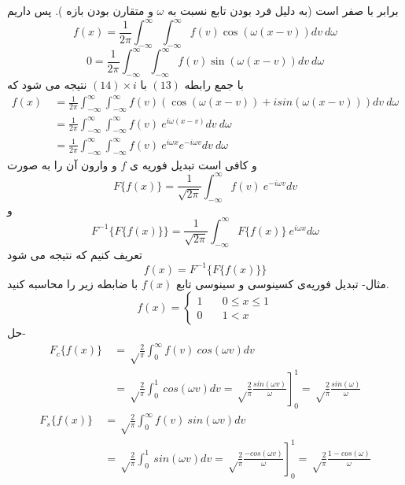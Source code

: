 برابر با صفر است (به دلیل فرد بودن تابع نسبت به
$\omega$
و متقارن بودن بازه
).
پس داریم
\begin{equation}
	f(x)= \frac{1}{2\pi}\int_{-{\infty}}^{{\infty}}\int_{-{\infty}}^{{\infty}} f(v)\cos(  \omega(x-v) ) d v \ d\omega
\end{equation}
\begin{equation}
	0= \frac{1}{2\pi}\int_{-{\infty}}^{{\infty}}\int_{-{\infty}}^{{\infty}} f(v)\sin(  \omega(x-v) ) d v \ d\omega
\end{equation}
با جمع رابطه
$(13)$
با
$(14)\times i$
نتیجه می شود که
\begin{equation*}
	\begin{aligned}
		f(x) {} &\
		= \frac{1}{2\pi}\int_{-{\infty}}^{{\infty}}\int_{-{\infty}}^{{\infty}} f(v)(\cos(\omega(x-v)) +isin(  \omega(x-v)) ) d v \ d\omega
		\\ &\
		=\frac{1}{2\pi}\int_{-{\infty}}^{{\infty}}\int_{-{\infty}}^{{\infty}} f(v) \ e^{i\omega(x-v)} d v \ d\omega
		\\ &\
		=\frac{1}{2\pi}\int_{-{\infty}}^{{\infty}}\int_{-{\infty}}^{{\infty}} f(v) \ e^{i\omega x} e^{-i\omega v} d v \ d\omega
	\end{aligned}
\end{equation*}
و کافی است تبدیل فوریه ی
$f$
و وارون آن را به صورت
\[
F\{f(x)\}=\frac{1} {\sqrt{2\pi}}\int_{-{\infty}}^{{\infty}} f(v) \ e^{-i\omega v} d v
\]
و
\[
F^{-1}\{F\{f(x)\}\}=\frac{1} {\sqrt{2\pi}}\int_{-{\infty}}^{{\infty}}F\{f(x)\} \ e^{i\omega x} d \omega
\]
تعریف کنیم که نتیجه می شود
\[
f(x)=F^{-1}\{F\{f(x)\}\}
\]
مثال- تبدیل فوریه‌‌ی کسینوسی و سینوسی تابع 
$f(x)$
با ضابطه زیر را محاسبه کنید.
\[
f(x) =
\begin{cases}
	1       & \quad 0\le x\le 1 \\
	0  & \quad 1<x
\end{cases}
\]
حل-
\begin{equation*}
	\begin{aligned}
		F_{c}\{f(x)\} {} &\
		=\sqrt \frac{2}{\pi}\int_{0}^{{\infty}} f(v)\ cos(\omega v)  d v
		\\ &\
		=\sqrt \frac{2}{\pi}\int_{0}^{1}\ cos(\omega v)  d v=\left.\sqrt \frac{2}{\pi}\frac{ sin(\omega v)}{\omega} \right]_{0}^{1}=\sqrt \frac{2}{\pi}\frac{ sin(\omega )}{\omega}
	\end{aligned}
\end{equation*}
\begin{equation*}
	\begin{aligned}
		F_{s}\{f(x)\} {} &\
		=\sqrt \frac{2}{\pi}\int_{0}^{{\infty}} f(v)\ sin(\omega v)  d v
		\\ &\
		=\sqrt \frac{2}{\pi}\int_{0}^{1}\ sin(\omega v)  d v=\left.\sqrt \frac{2}{\pi}\frac{ -cos(\omega v)}{\omega} \right]_{0}^{1}=\sqrt \frac{2}{\pi}\frac{1- cos(\omega )}{\omega}
	\end{aligned}
\end{equation*}
